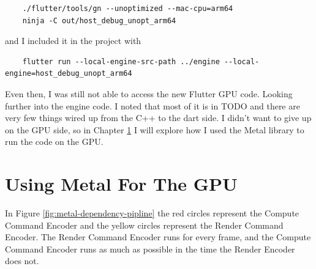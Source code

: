 \begin{verbatim}
    ./flutter/tools/gn --unoptimized --mac-cpu=arm64
    ninja -C out/host_debug_unopt_arm64
\end{verbatim}

and I included it in the project with 
\begin{verbatim}
    flutter run --local-engine-src-path ../engine --local-engine=host_debug_unopt_arm64
\end{verbatim}

Even then, I was still not able to access the new Flutter GPU code. Looking further into the engine code. I noted that most of it is in TODO and there are very few things wired up from the C++ to the dart side. I didn't want to give up on the GPU side, so in Chapter \ref{chap:metal} I will explore how I used the Metal library to run the code on the GPU.

\section{Using Metal For The GPU}\label{chap:metal}

In Figure \ref{fig:metal-dependency-pipline} the red circles represent the Compute Command Encoder and the yellow circles represent the Render Command Encoder.
The Render Command Encoder runs for every frame, and the Compute Command Encoder runs as much as possible in the time the Render Encoder does not.


